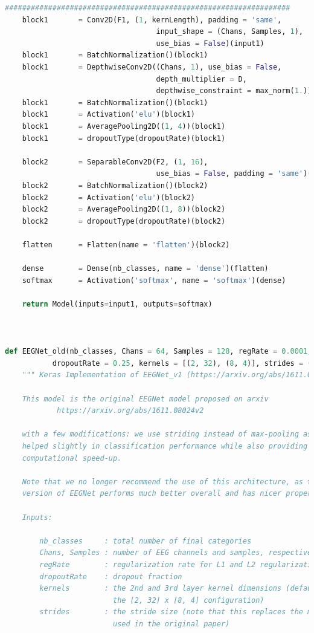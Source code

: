 \documentclass[conference]{IEEEtran}
\begin{document}
\begin{lstlisting}[language=Python, caption=Machine Learning Model, label=ml_model]
    ##################################################################
    block1       = Conv2D(F1, (1, kernLength), padding = 'same',
                                   input_shape = (Chans, Samples, 1),
                                   use_bias = False)(input1)
    block1       = BatchNormalization()(block1)
    block1       = DepthwiseConv2D((Chans, 1), use_bias = False, 
                                   depth_multiplier = D,
                                   depthwise_constraint = max_norm(1.))(block1)
    block1       = BatchNormalization()(block1)
    block1       = Activation('elu')(block1)
    block1       = AveragePooling2D((1, 4))(block1)
    block1       = dropoutType(dropoutRate)(block1)
    
    block2       = SeparableConv2D(F2, (1, 16),
                                   use_bias = False, padding = 'same')(block1)
    block2       = BatchNormalization()(block2)
    block2       = Activation('elu')(block2)
    block2       = AveragePooling2D((1, 8))(block2)
    block2       = dropoutType(dropoutRate)(block2)
        
    flatten      = Flatten(name = 'flatten')(block2)
    
    dense        = Dense(nb_classes, name = 'dense')(flatten)
    softmax      = Activation('softmax', name = 'softmax')(dense)
    
    return Model(inputs=input1, outputs=softmax)



def EEGNet_old(nb_classes, Chans = 64, Samples = 128, regRate = 0.0001,
           dropoutRate = 0.25, kernels = [(2, 32), (8, 4)], strides = (2, 4)):
    """ Keras Implementation of EEGNet_v1 (https://arxiv.org/abs/1611.08024v2)

    This model is the original EEGNet model proposed on arxiv
            https://arxiv.org/abs/1611.08024v2
    
    with a few modifications: we use striding instead of max-pooling as this 
    helped slightly in classification performance while also providing a 
    computational speed-up. 
    
    Note that we no longer recommend the use of this architecture, as the new
    version of EEGNet performs much better overall and has nicer properties.
    
    Inputs:
        
        nb_classes     : total number of final categories
        Chans, Samples : number of EEG channels and samples, respectively
        regRate        : regularization rate for L1 and L2 regularizations
        dropoutRate    : dropout fraction
        kernels        : the 2nd and 3rd layer kernel dimensions (default is 
                         the [2, 32] x [8, 4] configuration)
        strides        : the stride size (note that this replaces the max-pool
                         used in the original paper)
    

\end{lstlisting}
\end{document}
